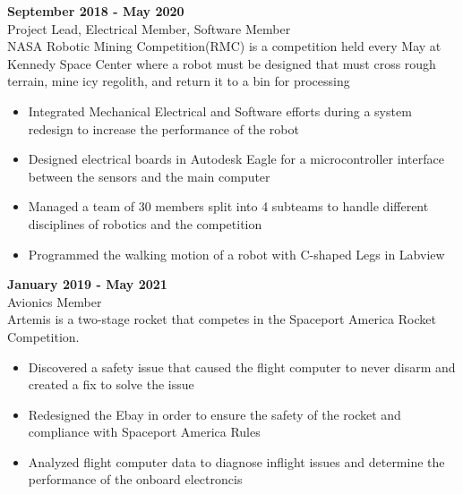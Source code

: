 {\begin{minipage}{\linewidth}
\end{minipage}
\vspace{\entrySpacing}

    \noindent\begin{minipage}{\linewidth}
 \hfill \textbf{September 2018 - May 2020}\\
Project Lead, Electrical Member, Software Member\hfill \\NASA Robotic Mining Competition(RMC) is a competition held every May at Kennedy Space Center where a robot must be designed that must cross rough terrain, mine icy regolith, and return it to a bin for processing
\begin{itemize}[noitemsep,nolistsep]
\item Integrated Mechanical Electrical and Software efforts during a system redesign  to increase the performance of the robot
\item Designed electrical boards in Autodesk Eagle for a microcontroller interface between the sensors and the main computer
\item Managed a team of 30 members split into 4 subteams to handle different disciplines of robotics and the competition
\item Programmed the walking motion of a robot with C-shaped Legs in Labview
\end{itemize}


\end{minipage}
\vspace{\entrySpacing}

    \noindent\begin{minipage}{\linewidth}
 \hfill \textbf{January 2019 - May 2021}\\
Avionics Member\hfill \\Artemis is a two-stage rocket that competes in the Spaceport America Rocket Competition.
\begin{itemize}[noitemsep,nolistsep]
\item Discovered a safety issue that caused the flight computer to never disarm and created a fix to solve the issue
\item Redesigned the Ebay in order to ensure the safety of the rocket and compliance with Spaceport America Rules
\item Analyzed flight computer data to diagnose inflight issues and determine the performance of the onboard electroncis
\end{itemize}



\end{minipage}}
